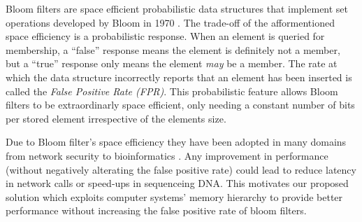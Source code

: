 Bloom filters are space efficient probabilistic data structures that implement set operations developed by Bloom in 1970 \cite{Bloom}.
The trade-off of the afformentioned space efficiency is a probabilistic response.
When an element is queried for membership, a ``false'' response means 
the element is definitely not a member, but a ``true'' response only means
the element \textit{may} be a member. 
The rate at which the data structure incorrectly reports that an element has been inserted is called the \textit{False Positive Rate (FPR)}.
This probabilistic feature allows Bloom filters to be extraordinarly space efficient,
only needing a constant number of bits per stored element irrespective of the elements size.

Due to Bloom filter's space efficiency they have been adopted in many domains from network security \cite{GERAVAND20134047} to bioinformatics \cite{btu558}.
Any improvement in performance (without negatively alterating the false positive rate) could lead to reduce latency in network calls or speed-ups in sequenceing DNA.
This motivates our proposed solution which exploits computer systems' memory hierarchy to provide better performance without increasing the false positive rate of bloom filters.